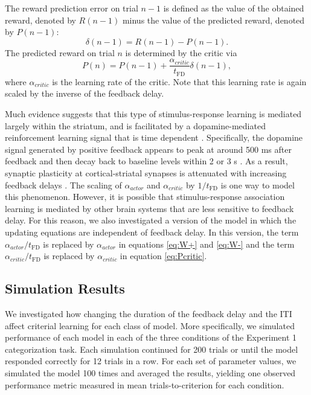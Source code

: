 \documentclass[doc, floatsintext]{apa7}
\begin{document}
The reward prediction error on trial $n-1$ is defined as the
value of the obtained reward, denoted by $R(n-1)$ minus the
value of the predicted reward, denoted by $P(n-1)$:
\begin{equation}
  \delta(n-1) = R(n-1) - P(n-1).
\end{equation}
The predicted reward on trial $n$ is determined by the
critic via
\begin{equation}
  P(n) = P(n-1) + \frac{\alpha_{critic}}{t_\text{FD}} \delta(n-1),
  \label{eq:Pcritic}
\end{equation}
where $\alpha_{critic}$ is the learning rate of the critic.
Note that this learning rate is again scaled by the inverse
of the feedback delay. 

Much evidence suggests that this type of stimulus-response
learning is mediated largely within the striatum, and is
facilitated by a dopamine-mediated reinforcement learning
signal that is time dependent
\parencite[e.g.,][]{ValentinMaddoxAshby2014}. Specifically,
the dopamine signal generated by positive feedback appears
to peak at around 500 ms after feedback and then decay back
to baseline levels within 2 or 3 s
\parencite{YagishitaEtAl2014}. As a result, synaptic
plasticity at cortical-striatal synapses is attenuated with
increasing feedback delays \parencite{YagishitaEtAl2014}.
The scaling of $\alpha_{actor}$ and $\alpha_{critic}$ by
$1/{t_\text{FD}}$ is one way to model this phenomenon.
However, it is possible that stimulus-response association
learning is mediated by other brain systems that are less
sensitive to feedback delay. For this reason, we also
investigated a version of the model in which the updating
equations are independent of feedback delay. In this
version, the term $\alpha_{actor}/t_\text{FD}$ is replaced
by $\alpha_{actor}$ in equations \ref{eq:W+} and \ref{eq:W-}
and the term $\alpha_{critic}/t_\text{FD}$ is replaced by
$\alpha_{critic}$ in equation \ref{eq:Pcritic}.

\subsection{Simulation Results}
We investigated how changing the duration of the feedback
delay and the ITI affect criterial learning for each class
of model. More specifically, we simulated performance of
each model in each of the three conditions of the Experiment
1 categorization task. Each simulation continued for 200
trials or until the model responded correctly for 12 trials
in a row. For each set of parameter values, we simulated the
model 100 times and averaged the results, yielding one
observed performance metric measured in mean
trials-to-criterion for each condition. 
\end{document}
